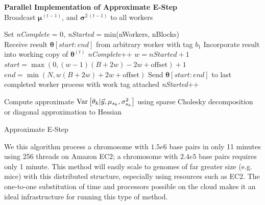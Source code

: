 \begin{algorithm}%
 \hspace{-8pt} \textbf{Parallel Implementation of Approximate E-Step}\\
 Broadcast $\bm \mu^{(t-1)}$, and $\bm \sigma^{2\,(t-1)}$ to all workers \;

  {

 Set \textit{nComplete} = 0, \textit{nStarted} = min(nWorkers, nBlocks) \\
  {
   Receive result $\bm \theta[start:end]$ from arbitrary worker with tag $b_1$ \;
   Incorporate result into working copy of $\bm \theta^{(t)}$ \;
   \textit{nComplete}++ \;
    {
     $w = nStarted + 1$\;
     $start = \max(0, (w - 1)(B + 2w) - 2w + \mbox{offset}) + 1$\;
     $end = \min(N, w(B + 2w) + 2w + \mbox{offset})$\;
     Send $\bm \theta[start:end] $ to last completed worker process with work tag attached\;
     \textit{nStarted}++\;
   }
 }
 }

 Compute approximate $\operatorname{Var} \left[ \theta_k | \vec y, \mu_{s_k}, \sigma^2_{s_k}  \right]$ using sparse Cholesky decomposition or diagonal approximation to Hessian\;

 \caption{Approximate E-Step \label{alg:parallel}}
\end{algorithm}

We this algorithm process a chromosome with $1.5e6$ base pairs in only 11 minutes using 256 threads on Amazon EC2; a chromosome with $2.4e5$ base pairs requires only 1 minute.
This method will easily scale to genomes of far greater size (e.g. mice) with this distributed structure, especially using resources such as EC2.
The one-to-one substitution of time and processors possible on the cloud makes it an ideal infrastructure for running this type of method.


\clearpage

